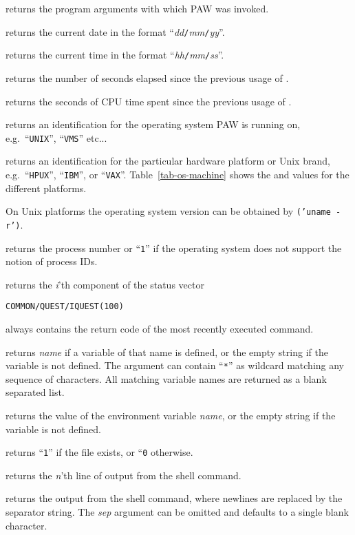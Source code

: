 \begin{UL}
\item\label{ref-dollar-args}
 returns the program arguments with which PAW
was invoked. 
\item
{} returns the current date in the format
``\textsl{dd}\texttt{/}\textsl{mm}\texttt{/}\textsl{yy}''.
\item
{} returns the current time in the format
``\textsl{hh}\texttt{/}\textsl{mm}\texttt{/}\textsl{ss}''.
\item
{} returns the number of seconds elapsed since the
previous usage of .
\item
{} returns the seconds of CPU time spent since the
previous usage of .
\item
{} returns an identification for the operating system PAW is
running on, e.g.\ ``\texttt{UNIX}'', ``\texttt{VMS}'' etc...
\item
{} returns an identification for the particular hardware
platform or Unix brand, e.g.\ ``\texttt{HPUX}'', ``\texttt{IBM}'', or
``\texttt{VAX}''.
Table~\ref{tab-os-machine} shows the  and
 values for the different platforms.

On Unix platforms the operating system version can be obtained by
\texttt{('uname -r')}.
\item
{} returns the process number or ``\texttt{1}'' if
the operating system does not support the notion of process IDs.
\item
{} returns the \textsl{i}'th component of the
status vector
\begin{alltt}
      COMMON /QUEST/ IQUEST(100)
\end{alltt}
 always contains the return code of the most recently
executed command.
\item
{} returns \textsl{name} if a variable of that
name is defined, or the empty string if the variable is not defined.
The argument can contain ``\texttt{*}'' as wildcard matching any sequence
of characters.
All matching variable names are returned as a blank separated list.
\item
{} returns the value of the environment
variable \textsl{name}, or the empty string if the variable is not defined.
\item
{} returns ``\texttt{1}'' if the file
exists, or ``\texttt{0} otherwise.
\item
{} returns the \textsl{n}'th line
of output from the shell command.
\item
{} returns the output from the 
shell command, where newlines are replaced by the separator string.
The \textsl{sep} argument can be omitted and defaults to a single
blank character.  


\end{UL}
